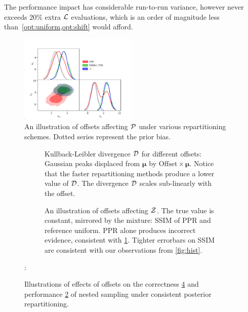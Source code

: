 \documentclass[usenatbib]{mnras}
\begin{document}
The
performance impact has considerable run-to-run variance, however never
exceeds \(20\%\) extra \({\cal L}\) evaluations, which is an order of
magnitude less than~\vref{opt:uniform,opt:shift} would afford.

\begin{figure}
\includegraphics[width=0.5\textwidth]{./illustrations/convergence.pdf}
\caption{An illustration of offsets affecting ${\cal P}$ under various
  repartitioning schemes. Dotted series represent the prior
  bias. \label{fig:convergence}}
\end{figure}

\begin{figure} \centering
  \begin{subfigure}{0.86\columnwidth}
    \centering

    
    \caption{Kullback-Leibler divergence \({\cal D}\) for different
      offsets: Gaussian peaks displaced from \(\bm{\mu}\) by
      \(\text{Offset}\times \bm{\mu}\). Notice that the faster
      repartitioning methods produce a lower value of \({\cal
        D}\). The divergence \({\cal D}\) scales sub-linearly with the
      offset.\label{fig:kl-d}}
\end{subfigure}

\begin{subfigure}{0.86\columnwidth}
  \centering

  
  
  \caption{An illustration of offsets affecting ${\cal Z}$. The true
    value is constant, mirrored by the mixture: SSIM of PPR and
    reference uniform. PPR alone produces incorrect evidence,
    consistent with \cref{fig:convergence}. Tighter errorbars on SSIM
    are consistent with our observations from
    \cref{fig:hist}.\label{fig:drift}}
\end{subfigure}
\caption{Illustrations of effects of offsets on the correctness
  \ref{fig:drift} and performance \ref{fig:kl-d} of nested sampling
  under consistent posterior repartitioning.}
:\end{figure}
\end{document}
